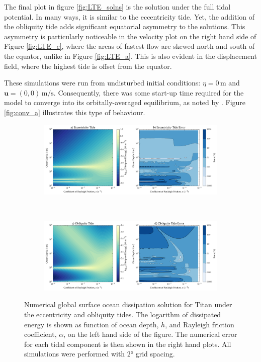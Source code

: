 The final plot in figure \ref{fig:LTE_solns} is the solution under the full tidal potential. In many ways, it is similar to the eccentricity tide. Yet, the addition of the obliquity tide adds significant equatorial asymmetry to the solutions. This asymmetry is particularly noticeable in the velocity plot on the right hand side of Figure \ref{fig:LTE_c}, where the areas of fastest flow are skewed north and south of the equator, unlike in Figure \ref{fig:LTE_a}. This is also evident in the displacement field, where the highest tide is offset from the equator.

These simulations were run from undisturbed initial conditions: \hbox{$\eta = 0 \, \si{\metre}$} and \hbox{$\bm{u} = (0,0) \, \si{\metre\per\second}$}. Consequently, there was some start-up time required for the model to converge into its orbitally-averaged equilibrium, as noted by \citet{sears1995tidal}. Figure \ref{fig:conv_a} illustrates this type of behaviour.

\begin{figure}[!t]
\centering
\begin{subfigure}{0.9\linewidth}
\centering
\includegraphics[width=\linewidth]{Figures/Eccentricity_error}
\subcaption{\label{fig:lincEccTitan}}
\end{subfigure}\\\vspace*{-0.5cm}
\begin{subfigure}{0.9\linewidth}
\centering
\includegraphics[width=\linewidth]{Figures/Obliquity_error}
\subcaption{\label{fig:linObliqTitan}}
\end{subfigure}
\vspace*{-0.8cm}
\caption{Numerical global surface ocean dissipation solution for Titan under the eccentricity and obliquity tides. The logarithm of dissipated energy is shown as function of ocean depth, $h$, and Rayleigh friction coefficient, $\alpha$, on the left hand side of the figure. The numerical error for each tidal component is then shown in the right hand plots. All simulations were performed with $\ang{2}$ grid spacing. \label{fig:linTitan}}
\end{figure}

